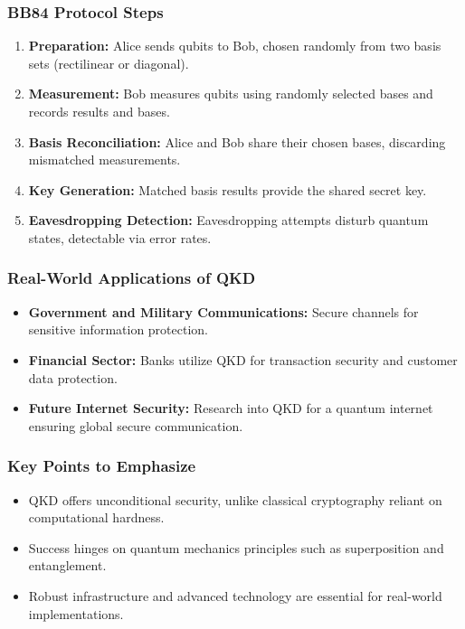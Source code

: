 \documentclass{beamer}
\begin{document}
\begin{frame}[fragile]
    \frametitle{BB84 Protocol Steps}
    \begin{enumerate}
        \item \textbf{Preparation:} Alice sends qubits to Bob, chosen randomly from two basis sets (rectilinear or diagonal).
        \item \textbf{Measurement:} Bob measures qubits using randomly selected bases and records results and bases.
        \item \textbf{Basis Reconciliation:} Alice and Bob share their chosen bases, discarding mismatched measurements.
        \item \textbf{Key Generation:} Matched basis results provide the shared secret key.
        \item \textbf{Eavesdropping Detection:} Eavesdropping attempts disturb quantum states, detectable via error rates.
    \end{enumerate}
\end{frame}

\begin{frame}[fragile]
    \frametitle{Real-World Applications of QKD}
    \begin{itemize}
        \item \textbf{Government and Military Communications:} Secure channels for sensitive information protection.
        \item \textbf{Financial Sector:} Banks utilize QKD for transaction security and customer data protection.
        \item \textbf{Future Internet Security:} Research into QKD for a quantum internet ensuring global secure communication.
    \end{itemize}
\end{frame}

\begin{frame}[fragile]
    \frametitle{Key Points to Emphasize}
    \begin{itemize}
        \item QKD offers unconditional security, unlike classical cryptography reliant on computational hardness.
        \item Success hinges on quantum mechanics principles such as superposition and entanglement.
        \item Robust infrastructure and advanced technology are essential for real-world implementations.
    \end{itemize}
\end{frame}
\end{document}
